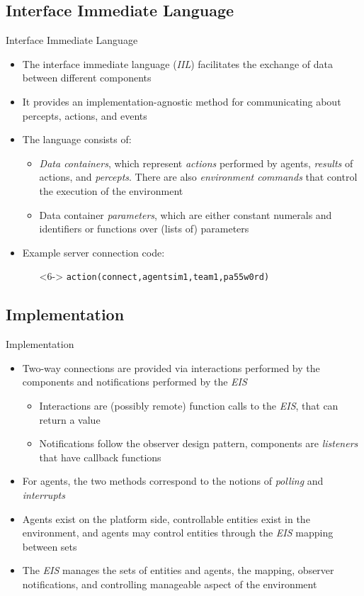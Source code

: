 \documentclass[t]{beamer}
\begin{document}
\subsection{Interface Immediate Language}
\begin{frame}{Interface Immediate Language}
\begin{itemize}[<+->]
	\item The interface immediate language (\emph{IIL}) facilitates the exchange of data between different components
	\item It provides an implementation-agnostic method for communicating about percepts, actions, and events
	\item The language consists of:
	\begin{itemize}
		\item \textit{Data containers}, which represent \textit{actions} performed by agents, \textit{results} of actions, and \textit{percepts}. There are also \textit{environment commands} that control the execution of the environment
		\item Data container \textit{parameters}, which are either constant numerals and identifiers or functions over (lists of) parameters
	\end{itemize}
	\item Example server connection code:\nolinebreak\begin{itemize}
		\item[]<6-> \texttt{action(connect,agentsim1,team1,pa55w0rd)}
	\end{itemize}
\end{itemize}
\end{frame}
\subsection{Implementation}
\begin{frame}{Implementation}
\begin{itemize}[<+->]
	\item Two-way connections are provided via interactions performed by the components and notifications performed by the \emph{EIS}
	\begin{itemize}
		\item Interactions are (possibly remote) function calls to the \emph{EIS}, that can return a value
		\item Notifications follow the observer design pattern, components are \textit{listeners} that have callback functions
	\end{itemize}
	\item For agents, the two methods correspond to the notions of \textit{polling} and \textit{interrupts}
	\item Agents exist on the platform side, controllable entities exist in the environment, and agents may control entities through the \emph{EIS} mapping between sets
	\item The \emph{EIS} manages the sets of entities and agents, the mapping, observer notifications, and controlling manageable aspect of the environment
\end{itemize}
\end{frame}
\end{document}
